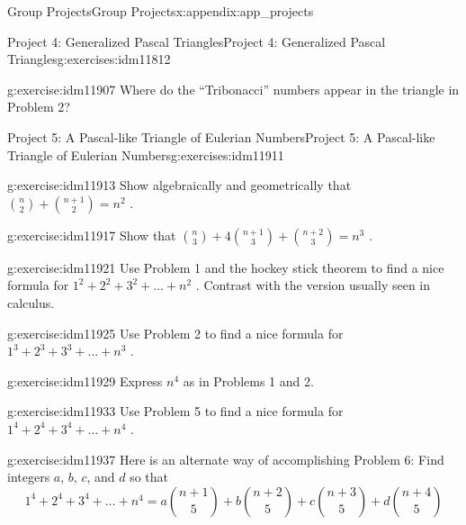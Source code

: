 \documentclass[oneside,10pt,]{book}
\numberwithin{equation}{chapter}
\begin{document}
\begin{appendixptx}{Group Projects}{}{Group Projects}{}{}{x:appendix:app_projects}
\begin{exercises-section-numberless}{Project 4: Generalized Pascal Triangles}{}{Project 4: Generalized Pascal Triangles}{}{}{g:exercises:idm11812}
\begin{divisionexercise}{8}{}{}{g:exercise:idm11907}%
Where do the ``Tribonacci'' numbers appear in the triangle in Problem 2?%
\end{divisionexercise}%
\end{exercises-section-numberless}
%
%
\typeout{************************************************}
\typeout{************************************************}
%
\begin{exercises-section-numberless}{Project 5: A Pascal-like Triangle of Eulerian Numbers}{}{Project 5: A Pascal-like Triangle of Eulerian Numbers}{}{}{g:exercises:idm11911}
\begin{divisionexercise}{1}{}{}{g:exercise:idm11913}%
Show algebraically and geometrically that \(\binom{n}{2}
+
\binom{n + 1}{2}
= n^{2}\) .%
\end{divisionexercise}%
\begin{divisionexercise}{2}{}{}{g:exercise:idm11917}%
Show that \(\binom{n}{3}
+ 4
\binom{n + 1}{3}
+
\binom{n + 2}{3}
= n^{3}\) .%
\end{divisionexercise}%
\begin{divisionexercise}{3}{}{}{g:exercise:idm11921}%
Use Problem 1 and the hockey stick theorem to find a nice formula for \(1^{2} + 2^{2} + 3^{2} + \ldots + n^{2}\) . Contrast with the version usually seen in calculus.%
\end{divisionexercise}%
\begin{divisionexercise}{4}{}{}{g:exercise:idm11925}%
Use Problem 2 to find a nice formula for \(1^{3} + 2^{3} + 3^{3} + \ldots + n^{3}\) .%
\end{divisionexercise}%
\begin{divisionexercise}{5}{}{}{g:exercise:idm11929}%
Express \(n^{4}\) as in Problems 1 and 2.%
\end{divisionexercise}%
\begin{divisionexercise}{6}{}{}{g:exercise:idm11933}%
Use Problem 5 to find a nice formula for \(1^{4} + 2^{4} + 3^{4} + \ldots + n^{4}\) .%
\end{divisionexercise}%
\begin{divisionexercise}{7}{}{}{g:exercise:idm11937}%
Here is an alternate way of accomplishing Problem 6:  Find integers \(a\), \(b\), \(c\), and \(d\) so that%
\begin{equation*}
1^{4} + 2^{4} + 3^{4} + \ldots + n^{4} = a\binom{n + 1}{5}  + b\binom{n + 2}{5}  + c\binom{n + 3}{5}  + d\binom{n + 4}{5}

\end{equation*}
\end{divisionexercise}
\end{exercises-section-numberless}
\end{appendixptx}
\end{document}
